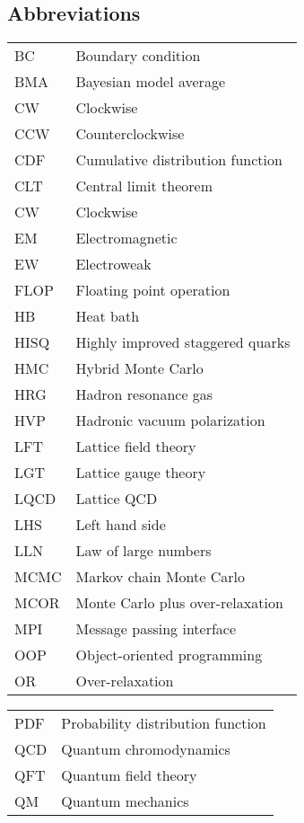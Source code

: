 \documentclass[12pt]{book}
\theoremstyle{definition}
\newenvironment{frontstuff}
  {\centering\chapter*{}}
  {\clearpage}
\begin{document}
\begin{frontstuff}
\section*{Abbreviations}
\begin{tabular}{ll}
BC      &       Boundary condition \\
BMA     &       Bayesian model average \\
CW      &       Clockwise \\
CCW     &       Counterclockwise\\
CDF     &       Cumulative distribution function \\
CLT     &       Central limit theorem\\
CW      &       Clockwise\\
EM      &       Electromagnetic\\
EW      &       Electroweak\\
FLOP    &       Floating point operation\\
HB      &       Heat bath\\
HISQ    &       Highly improved staggered quarks\\
HMC     &       Hybrid Monte Carlo\\
HRG     &       Hadron resonance gas\\
HVP     &       Hadronic vacuum polarization\\
LFT     &       Lattice field theory\\
LGT     &       Lattice gauge theory\\
LQCD    &       Lattice QCD\\
LHS     &       Left hand side\\
LLN     &       Law of large numbers\\
MCMC    &       Markov chain Monte Carlo\\
MCOR    &       Monte Carlo plus over-relaxation \\
MPI     &       Message passing interface \\
OOP     &       Object-oriented programming \\
OR      &       Over-relaxation\\
\end{tabular}
\clearpage
\begin{tabular}{ll}
PDF     &       Probability distribution function \\
QCD     &       Quantum chromodynamics \\
QFT     &       Quantum field theory \\
QM      &       Quantum mechanics \\

\end{tabular}
\end{frontstuff}
\end{document}
